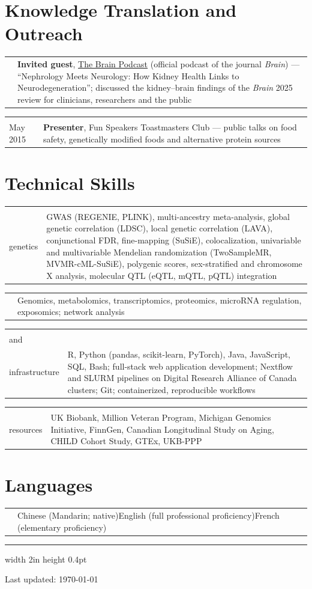 \documentclass[11pt,letterpaper,roman]{moderncv}   %
\makeatletter
\renewcommand*{\cvitem}[3][.25em]{%
  \begin{tabular}{@{}p{\hintscolumnwidth}@{\hspace{\separatorcolumnwidth}}p{\maincolumnwidth}@{}}%
    \raggedleft\hintstyle{#2} &{#3}%
  \end{tabular}%
  \par\addvspace{#1}}
\newcommand*{\lastupdated}[1]{%
  \par\nobreak\vfill
  \hrule width 2in height 0.4pt\kern 2.6pt
  {\footnotesize\noindent\rule{0pt}{7.7pt}Last updated: #1\par}}
\makeatother
\begin{document}
\section{Knowledge Translation and Outreach}
\cvitem{June 2025}{\textbf{Invited guest}, \href{https://open.spotify.com/episode/0OdP5vSjzd7nMwLEeetqsR}{The Brain Podcast} (official podcast of the journal \textit{Brain}) --- ``Nephrology Meets Neurology: How Kidney Health Links to Neurodegeneration''; discussed the kidney--brain findings of the \textit{Brain} 2025 review for clinicians, researchers and the public}
\cvitem{Oct. 2014--\\May 2015}{\textbf{Presenter}, Fun Speakers Toastmasters Club --- public talks on food safety, genetically modified foods and alternative protein sources}

\section{Technical Skills}
\cvitem{Statistical\\genetics}{GWAS (REGENIE, PLINK), multi-ancestry meta-analysis, global genetic correlation (LDSC), local genetic correlation (LAVA), conjunctional FDR, fine-mapping (SuSiE), colocalization, univariable and multivariable Mendelian randomization (TwoSampleMR, MVMR-cML-SuSiE), polygenic scores, sex-stratified and chromosome X analysis, molecular QTL (eQTL, mQTL, pQTL) integration}
\cvitem{Multi-omics}{Genomics, metabolomics, transcriptomics, proteomics, microRNA regulation, exposomics; network analysis}
\cvitem{Programming\\and\\infrastructure}{R, Python (pandas, scikit-learn, PyTorch), Java, JavaScript, SQL, Bash; full-stack web application development; Nextflow and SLURM pipelines on Digital Research Alliance of Canada clusters; Git; containerized, reproducible workflows}
\cvitem{Data\\resources}{UK Biobank, Million Veteran Program, Michigan Genomics Initiative, FinnGen, Canadian Longitudinal Study on Aging, CHILD Cohort Study, GTEx, UKB-PPP}

\section{Languages}
\cvitem{}{Chinese (Mandarin; native)\newline English (full professional proficiency)\newline French (elementary proficiency)}

\lastupdated{\today}
\end{document}
